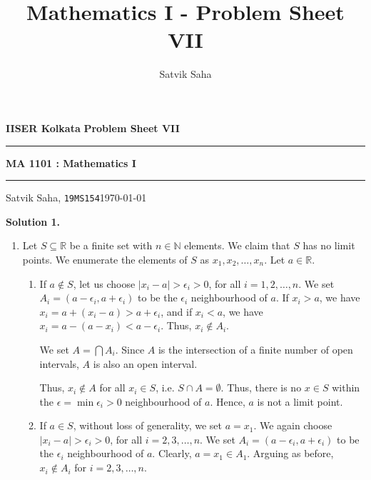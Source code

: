 \documentclass[10pt]{article}
\title{Mathematics I - Problem Sheet VII}
\author{Satvik Saha}
\date{}
\begin{document}
        \par\textbf{IISER Kolkata} \hfill \textbf{Problem Sheet VII}
        \vspace{3pt}
        \hrule
        \vspace{3pt}
        \begin{center}
                \LARGE{\textbf{MA 1101 : Mathematics I}}
        \end{center}
        \vspace{3pt}
        \hrule
        \vspace{3pt}
        Satvik Saha, \texttt{19MS154}\hfill\today
        \vspace{20pt}

        \textbf{Solution 1.}
        \begin{enumerate}
                \item Let $S \subseteq \mathbb{R}$ be a finite set with $n \in \mathbb{N}$ elements.
                We claim that $S$ has no limit points.
                We enumerate the elements of $S$ as $x_1, x_2, \dotsc, x_n$.
                Let $a \in \mathbb{R}$.

                \begin{enumerate}
                \item   If $a \notin S$, let us choose $|x_i - a| > \epsilon_i > 0$, for all $i = 1,2,\dotsc,n$.
                        We set $A_i = (a - \epsilon_i, a + \epsilon_i)$ to be the $\epsilon_i$ neighbourhood of $a$.
                        If $x_i > a$, we have $x_i = a + (x_i - a)> a + \epsilon_i$, and if $x_i < a$, we have $x_i = a - (a - x_i) < a - \epsilon_i$.
                        Thus, $x_i \notin A_i$.

                        We set $A = \bigcap A_i$.
                        Since $A$ is the intersection of a finite number of open intervals, $A$ is also an open interval.

                        Thus, $x_i \notin A$ for all $x_i \in S$, i.e. $S \cap A = \emptyset$.
                        Thus, there is no $x \in S$ within the $\epsilon = \min \epsilon_i > 0$ neighbourhood of $a$.
                        Hence, $a$ is not a limit point.
                \item   If $a \in S$, without loss of generality, we set $a = x_1$.
                        We again choose $|x_i - a| > \epsilon_i > 0$, for all $i = 2,3,\dotsc,n$.
                        We set $A_i = (a - \epsilon_i, a + \epsilon_i)$ to be the $\epsilon_i$ neighbourhood of $a$.
                        Clearly, $a = x_1 \in A_1$.
                        Arguing as before, $x_i \notin A_i$ for $i = 2,3,\dotsc,n$.


\end{enumerate}
\end{enumerate}
\end{document}
